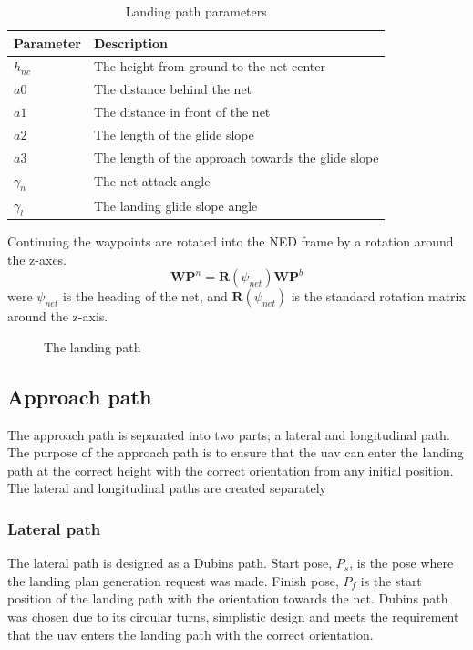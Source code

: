 \begin{table}[H]
\begin{center}
    \begin{tabular}{ | l | l |}
    \hline
    \textbf{Parameter} & \textbf{Description} \\ \hline
    $h_{nc}$ & The height from ground to the net center \\ \hline
    $a0$ & The distance behind the net \\ \hline
    $a1$ & The distance in front of the net \\ \hline
    $a2$ & The length of the glide slope \\ \hline
    $a3$ & The length of the approach towards the glide slope \\ \hline
    $\gamma_n$ & The net attack angle \\ \hline
    $\gamma_l$ & The landing glide slope angle \\ \hline
    \end{tabular}
\end{center}
\caption{Landing path parameters }
\label{Tb:Approach Parameters}
\end{table}
Continuing the waypoints are rotated into the NED frame by a rotation around the z-axes.
\begin{equation}
\mathbf{WP}^n = \mathbf{R}(\psi_{net})\mathbf{WP}^b
\end{equation}
were $\psi_{net}$ is the heading of the net, and $\mathbf{R}(\psi_{net})$ is the standard rotation matrix around the z-axis.
\begin{figure}
\def\svgwidth{\textwidth} %

\caption{The landing path}
\label{Fig:LandingPhase}
\end{figure}

\subsection{Approach path}\label{SS:LandingApproach}
The approach path is separated into two parts; a lateral and longitudinal path. The purpose of the approach path is to ensure that the \gls{uav} can enter the landing path at the correct height with the correct orientation from any initial position. The lateral and longitudinal paths are created separately 
\subsubsection{Lateral path}
The lateral path is designed as a Dubins path. Start pose, $P_s$, is the pose where the landing plan generation request was made. Finish pose, $P_f$ is the start position of the landing path with the orientation towards the net. Dubins path was chosen due to its circular turns, simplistic design and meets the requirement that the \gls{uav} enters the landing path with the correct orientation.

